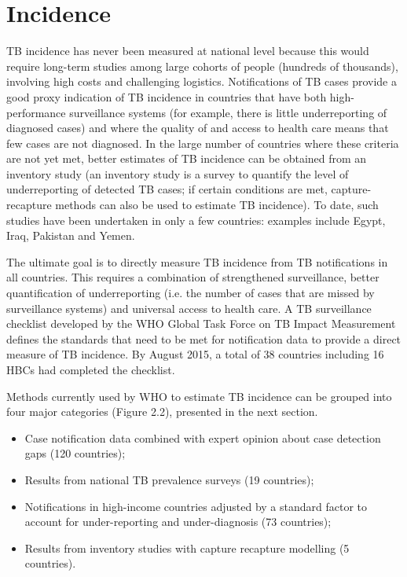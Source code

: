 \section{Incidence}

TB incidence has never been measured at national level because this would require long-term studies among large cohorts of people (hundreds of thousands), involving high costs and challenging logistics. Notifications of TB cases provide a good proxy indication of TB incidence in countries that have both high-performance surveillance systems (for example, there is little underreporting of diagnosed cases) and where the quality of and access to health care means that few cases are not diagnosed. In the large number of countries where these criteria are not yet met, better estimates of TB incidence can be obtained from an inventory study\cite{WHO2012} (an inventory study is a survey to quantify the level of underreporting of detected TB cases; if certain conditions are met, capture-recapture methods can also be used to estimate TB incidence). To date, such studies have been undertaken in only a few countries: examples include Egypt, Iraq, Pakistan and Yemen. 

The ultimate goal is to directly measure TB incidence from TB notifications in all countries. This requires a combination of strengthened surveillance, better quantification of underreporting (i.e. the number of cases that are missed by surveillance systems) and universal access to health care. A TB surveillance checklist developed by the WHO Global Task Force on TB Impact Measurement defines the standards that need to be met for notification data to provide a direct measure of TB incidence. By August 2015, a total of 38 countries including 16 HBCs had completed the checklist. 

Methods currently used by WHO to estimate TB incidence can be grouped into four major categories (Figure 2.2), presented in the next section. 

\begin{itemize}
\item Case notification data combined with expert opinion about case detection gaps (120 countries);
\item Results from national TB prevalence surveys (19 countries);
\item Notifications in high-income countries adjusted by a standard factor to account for under-reporting and under-diagnosis (73 countries);
\item Results from inventory studies with capture recapture modelling (5 countries).
\end{itemize}






  
  
  
  
  
  
  
  
  
  